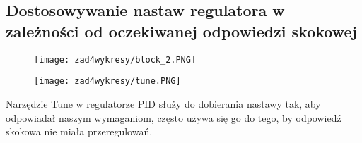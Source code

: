 \subsection{Dostosowywanie nastaw regulatora w zależności od oczekiwanej odpowiedzi skokowej}

	\begin{figure}[H]
    \centering
    \texttt{[image: zad4wykresy/block\_2.PNG]}
    \label{lamana}
	\end{figure}
	
	\begin{figure}[H]
    \centering
    \texttt{[image: zad4wykresy/tune.PNG]}
    \label{lamana}
	\end{figure}
	

Narzędzie Tune w regulatorze PID służy do dobierania nastawy tak, aby  odpowiadał naszym wymaganiom, często używa się go do tego, by odpowiedź skokowa nie miała przeregulowań.